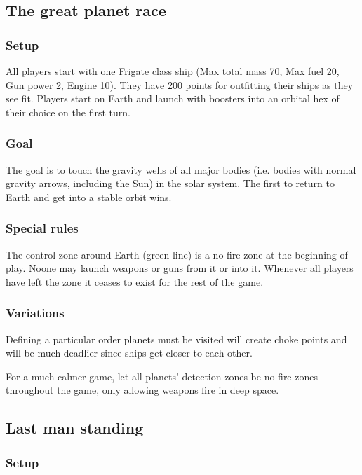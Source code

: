 \documentclass[a4paper,12pt,notitlepage,twocolumn]{article}
\begin{document}
\subsection{The great planet race}

\subsubsection*{Setup}

All players start with one Frigate class ship (Max total mass 70, Max
fuel 20, Gun power 2, Engine 10). They have 200 points for outfitting
their ships as they see fit. Players start on Earth and launch with
boosters into an orbital hex of their choice on the first turn. 

\subsubsection*{Goal}

The goal is to touch the gravity wells of all major bodies
(i.e. bodies with normal gravity arrows, including the Sun) in the
solar system. The first to return to Earth and get into a stable orbit
wins. 

\subsubsection*{Special rules}

The control zone around Earth (green line) is a no-fire zone at the
beginning of play. Noone may launch weapons or guns from it or into
it.  Whenever all players have left the zone it ceases to exist for the rest of the
game. 

\subsubsection*{Variations}

Defining a particular order planets must be visited will create choke points and
will be much deadlier since ships get closer to each other. 

For a much calmer game, let all planets' detection zones be no-fire
zones throughout the game, only allowing weapons fire in deep space. 

\subsection{Last man standing}

\subsubsection*{Setup}
\end{document}
